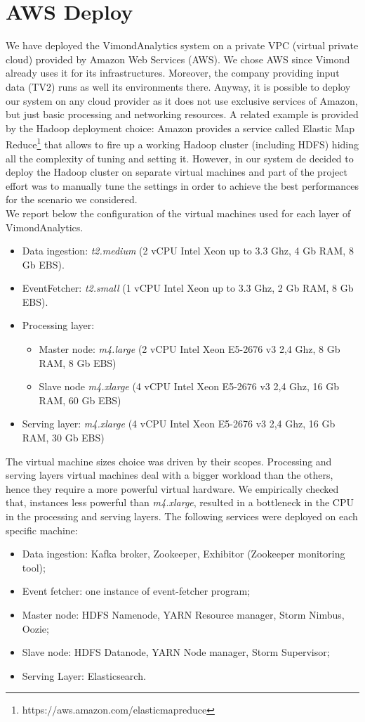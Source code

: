 \section{AWS Deploy}
\label{deploy}
We have deployed the VimondAnalytics system on a private VPC (virtual private cloud) provided by Amazon Web Services (AWS). We chose AWS since Vimond already uses it for its infrastructures. Moreover, the company providing input data (TV2) runs as well its environments there. Anyway, it is possible to deploy our system  on any cloud provider as it does not use exclusive services of Amazon, but just basic processing and networking resources. A related example is provided by the Hadoop deployment choice: Amazon provides a service called Elastic Map Reduce\footnote{https://aws.amazon.com/elasticmapreduce} that allows to fire up a working Hadoop cluster (including HDFS) hiding all the complexity of tuning and setting it. However, in our system de decided to deploy the Hadoop cluster on separate virtual machines and part of the project effort was to manually tune the settings in order to achieve the best performances for the scenario we considered.\\
We report below the configuration of the virtual machines used for each layer of VimondAnalytics.
\begin{itemize}
\item Data ingestion: \textit{t2.medium} (2 vCPU Intel Xeon up to 3.3 Ghz, 4 Gb RAM,  8 Gb EBS).
\item EventFetcher: \textit{t2.small} (1 vCPU Intel Xeon up to 3.3 Ghz, 2 Gb RAM,  8 Gb EBS).
\item Processing layer:
	\begin{itemize}
	\item Master node: \textit{m4.large} (2 vCPU Intel Xeon E5-2676 v3 2,4 Ghz, 8 Gb RAM, 8 Gb EBS)
	\item Slave node \textit{m4.xlarge} (4 vCPU Intel Xeon E5-2676 v3 2,4 Ghz, 16 Gb RAM, 60 Gb EBS)
	\end{itemize}
\item Serving layer: \textit{m4.xlarge} (4 vCPU Intel Xeon E5-2676 v3 2,4 Ghz, 16 Gb RAM, 30 Gb EBS)
\end{itemize}
The virtual machine sizes choice was driven by their scopes. Processing and serving layers virtual machines deal with a bigger workload than the others, hence they require a more powerful virtual hardware. We empirically checked that, instances less powerful than \textit{m4.xlarge}, resulted in a bottleneck in the CPU in the processing and serving layers.
The following services were deployed on each specific machine:
\begin{itemize}
\item Data ingestion: Kafka broker,  Zookeeper, Exhibitor (Zookeeper monitoring tool);
\item Event fetcher: one instance of event-fetcher program;
\item Master node: HDFS Namenode, YARN Resource manager, Storm Nimbus, Oozie;
\item Slave node: HDFS Datanode, YARN Node manager, Storm Supervisor;
\item Serving Layer: Elasticsearch.
\end{itemize}

